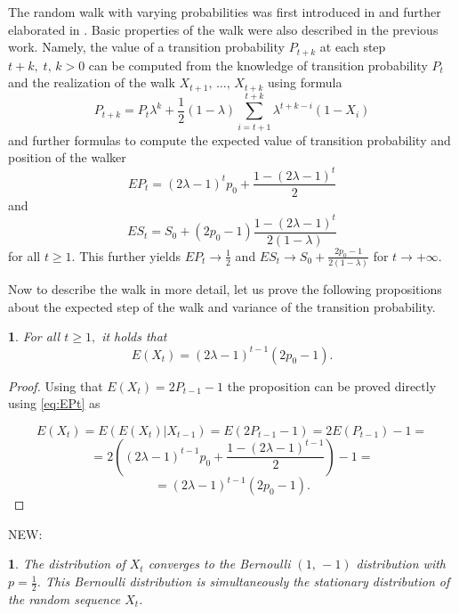 \documentclass{amsart}
\theoremstyle{definition}
\theoremstyle{plain}
\newtheorem{prop}[thm]{\protect\propositionname}
\theoremstyle{plain}
\newtheorem{cor}[thm]{\protect\corollaryname}
\theoremstyle{plain}
\numberwithin{equation}{section}
\providecommand{\corollaryname}{Corollary}
\providecommand{\propositionname}{Proposition}
\begin{document}
The random walk with varying probabilities was first introduced in
\cite{ja2017ddny} and further elaborated in \cite{ja2019teze}.
Basic properties of the walk were also described in the previous
work. Namely, the value of a transition probability $P_{t+k}$ at
each step $t+k,\;t,\,k>0$ can be computed from the knowledge of
transition probability $P_{t}$ and the realization of the walk
$X_{t+1},\,\dots,\,X_{t+k}$ using formula
\begin{equation}
P_{t+k}=P_{t}\lambda^{k}+\frac{1}{2}(1-\lambda)\sum_{i=t+1}^{t+k}\lambda^{t+k-i}(1-X_{i})\label{eq:Pt}
\end{equation} and further formulas to compute the expected value of transition probability and position of the walker
\begin{equation}
EP_{t}=(2\lambda-1)^{t}p_{0}+\frac{1-(2\lambda-1)^{t}}{2}\label{eq:EPt}
\end{equation}
and
\begin{equation}
ES_{t}=S_{0}+(2p_{0}-1)\frac{1-(2\lambda-1)^{t}}{2(1-\lambda)}\label{eq:ESt}
\end{equation}
 for all $t\geq1$. This further yields $EP_{t}\rightarrow\frac{1}{2}$
and $ES_{t}\rightarrow S_{0}+\frac{2p_{0}-1}{2(1-\lambda)}$ for $t\rightarrow+\infty$.

Now to describe the walk in more detail, let us
prove the following propositions about the expected step
of the walk and variance of the transition probability.

\begin{prop}\label{PropEXt-succes}
For all $t\geq1,$ it holds that
\begin{equation}
E(X_{t})=(2\lambda-1)^{t-1}(2p_{0}-1).
\end{equation}
\end{prop}
\begin{proof}
Using that $E(X_{t})=2P_{t-1}-1$ the proposition can be
proved directly using \eqref{eq:EPt} as

\[
E(X_{t})=E(E(X_{t})|X_{t-1})=E(2P_{t-1}-1)=2E(P_{t-1})-1=
\]
\[
=2((2\lambda-1)^{t-1}p_{0}+\frac{1-(2\lambda-1)^{t-1}}{2})-1=
\]
\[
=(2\lambda-1)^{t-1}(2p_{0}-1).
\]


\end{proof}

NEW:
\begin{cor}
\label{cor-stac-dist}
The distribution of $X_t$ converges to the Bernoulli $(1,\,-1)$ distribution with
$p=\frac{1}{2}$. This Bernoulli distribution is simultaneously the stationary distribution of the random sequence $X_t$.
\end{cor}
\end{document}
